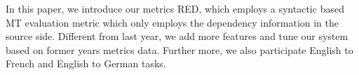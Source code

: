 In this paper, we introduce our metrics RED, which employs a syntactic based MT evaluation metric which only employs the dependency information in the source side. Different from last year, we add more features and tune our system based on former years metrics data. Further more, we also participate English to French and English to German tasks.
